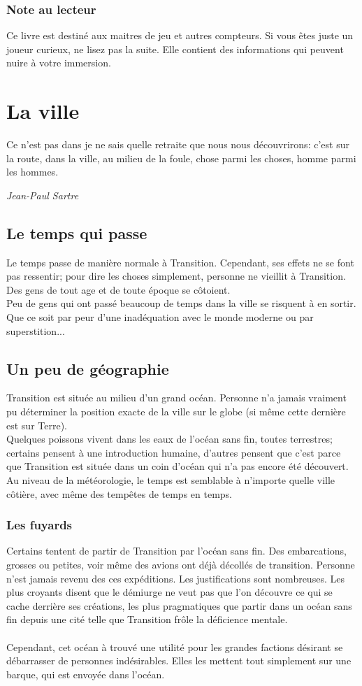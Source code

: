 \documentclass{book}
\begin{document}
\subsection*{Note au lecteur}
Ce livre est destiné aux maitres de jeu et autres compteurs. Si vous êtes juste un joueur curieux, ne lisez pas la suite. Elle contient des informations qui peuvent nuire à votre immersion.

\chapter{La ville}
\epigraph{Ce n'est pas dans je ne sais quelle retraite que nous nous découvrirons: c'est sur la route, dans la ville, au milieu de la foule, chose parmi les choses, homme parmi les hommes.}{\textit{Jean-Paul Sartre}}
\section{Le temps qui passe}
Le temps passe de manière normale à Transition. Cependant, ses effets ne se font pas ressentir; pour dire les choses simplement, personne ne vieillit à Transition. Des gens de tout age et de toute époque se côtoient.\\
Peu de gens qui ont passé beaucoup de temps dans la ville se risquent à en sortir. Que ce soit par peur d'une inadéquation avec le monde moderne ou par superstition...

\section{Un peu de géographie}
Transition est située au milieu d'un grand océan. Personne n'a jamais vraiment pu déterminer la position exacte de la ville sur le globe (si même cette dernière est sur Terre).\\
Quelques poissons vivent dans les eaux de l'océan sans fin, toutes terrestres; certains pensent à une introduction humaine, d'autres pensent que c'est parce que Transition est située dans un coin d'océan qui n'a pas encore été découvert.\\
Au niveau de la météorologie, le temps est semblable à n'importe quelle ville côtière, avec même des tempêtes de temps en temps.

\subsection{Les fuyards}
Certains tentent de partir de Transition par l'océan sans fin. Des embarcations, grosses ou petites, voir même des avions ont déjà décollés de transition. Personne n'est jamais revenu des ces expéditions. Les justifications sont nombreuses. Les plus croyants disent que le démiurge ne veut pas que l'on découvre ce qui se cache derrière ses créations, les plus pragmatiques que partir dans un océan sans fin depuis une cité telle que Transition frôle la déficience mentale.
\\
\\
Cependant, cet océan à trouvé une utilité pour les grandes factions désirant se débarrasser de personnes indésirables. Elles les mettent tout simplement sur une barque, qui est envoyée dans l'océan.
\end{document}

